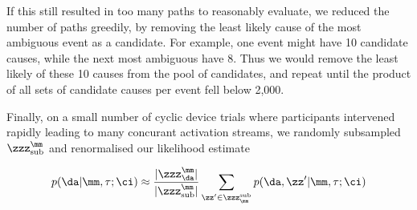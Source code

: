 If this still resulted in too many paths to reasonably evaluate, we reduced the number of paths greedily, by removing the least likely cause of the most ambiguous event as a candidate.  For example, one event might have 10 candidate causes, while the next most ambiguous have 8.  Thus we would remove the least likely of these 10 causes from the pool of candidates, and repeat until the product of all sets of candidate causes per event fell below 2,000.

Finally, on a small number of cyclic device trials where participants intervened rapidly leading to many concurant activation streams, we randomly subsampled  $\zzz_{\mathrm{sub}}^{\mm}$ and renormalised our likelihood estimate

\begin{equation}
p(\da|\mm,\tau;\ci) \approx  \frac{|\zzz_{\mathrm{\da}}^{\mm}|}{|\zzz_{\mathrm{sub}}^{\mm}|} \sum_{\zz^\prime \in \zzz^{\mathrm{sub}}_{\mm}}p(\da,{\zz}^{\prime} |\mm,\tau;\ci)
\end{equation} 

